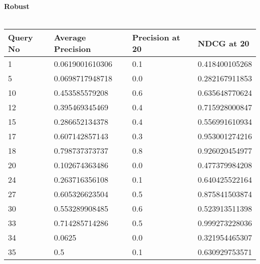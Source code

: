\documentclass[12pt,letterpaper]{article}
\begin{document}
\pagebreak

\textbf{Robust}
\\
\\
\begin{tabular}{| p{3.5cm} | p{3.5cm} | p{3.5cm} | p{3.5cm} |}
    \hline 
    Query No & Average Precision & Precision at 20 & NDCG at 20\\ \hline
    1 & 0.0619001610306 & 0.1 & 0.418400105268\\
    5 & 0.0698717948718 & 0.0 & 0.282167911853\\
    10 & 0.453585579208 & 0.6 & 0.635648770624\\
    12 & 0.395469345469 & 0.4 & 0.715928000847\\
    15 & 0.286652134378 & 0.4 & 0.556991610934\\
    17 & 0.607142857143 & 0.3 & 0.953001274216\\
    18 & 0.798737373737 & 0.8 & 0.926020454977\\
    20 & 0.102674363486 & 0.0 & 0.477379984208\\
    24 & 0.263716356108 & 0.1 & 0.640425522164\\
    27 & 0.605326623504 & 0.5 & 0.875841503874\\
    30 & 0.553289908485 & 0.6 & 0.523913511398\\
    33 & 0.714285714286 & 0.5 & 0.999273228036\\
    34 & 0.0625 & 0.0 & 0.321954465307\\
    35 & 0.5 & 0.1 & 0.630929753571\\
    
    \hline
\end{tabular}
\end{document}
